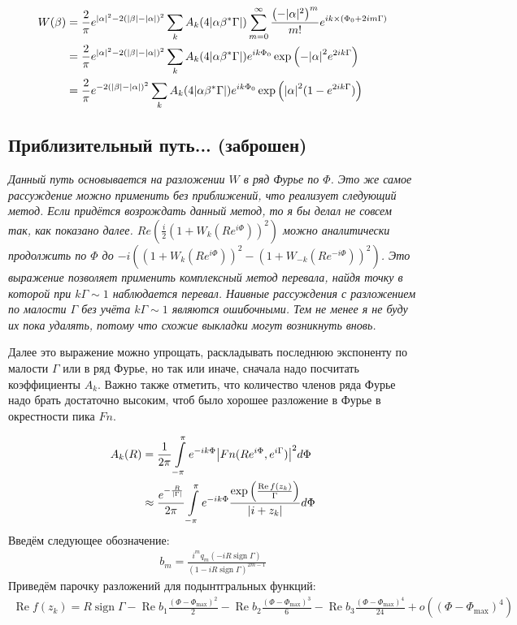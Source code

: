\documentclass[a4paper, 12pt]{article}
\DeclareMathOperator*{\sign}{sign}
\DeclareMathOperator*{\Real}{Re}
\newenvironment{eqw}{\begin{equation} \begin{aligned}}   
    {\end{aligned}    \end{equation}}
\begin{document}
\begin{eqw}
    W(\beta) &= \frac{2}{\pi}e^{\abs{\alpha}^2-2\left(\abs{\beta} - \abs{\alpha}\right)^2}
    \sum\limits_k A_k(4\abs{\alpha\beta^*\Gamma})
    \sum\limits_{m=0}^{\infty} \frac{\left(-|\alpha|^2\right)^m}{m!}e^{ik\times\left(\Phi_0+2im\Gamma\right)}\\
    &= \frac{2}{\pi}e^{\abs{\alpha}^2-2\left(\abs{\beta} - \abs{\alpha}\right)^2}
    \sum\limits_k A_k(4\abs{\alpha\beta^*\Gamma})e^{ik\Phi_0}
    \exp\left(-\abs{\alpha}^2 e^{2ik\Gamma}\right)\\
    &= \frac{2}{\pi}e^{-2\left(\abs{\beta} - \abs{\alpha}\right)^2}
    \sum\limits_k A_k(4\abs{\alpha\beta^*\Gamma})e^{ik\Phi_0}
    \exp\left(\abs{\alpha}^2 (1-e^{2ik\Gamma})\right)
\end{eqw}

\subsection*{Приблизительный путь... (заброшен)}
\textit{Данный путь основывается на разложении $W$ в ряд Фурье по $\Phi$. Это же самое рассуждение можно применить без приближений, что реализует следующий метод. Если придётся возрождать данный метод, то я бы делал не совсем так, как показано далее. $Re\left(\frac{i}{2}(1+W_k(Re^{i\Phi}))^2\right)$ можно аналитически продолжить по $\Phi$ до $-i\left(\left(1+W_k(Re^{i\Phi})\right)^2 - \left(1+W_{-k}(Re^{-i\Phi})\right)^2\right)$. Это выражение позволяет применить комплексный метод перевала, найдя точку в которой при $k\Gamma\sim 1$ наблюдается перевал. Наивные рассуждения с разложением по малости $\Gamma$ без учёта $k\Gamma\sim 1$ являются ошибочными. Тем не менее я не буду их пока удалять, потому что схожие выкладки могут возникнуть вновь.}

Далее это выражение можно упрощать, раскладывать последнюю экспоненту по малости $\Gamma$ или в ряд Фурье, но так или иначе, сначала надо посчитать коэффициенты $A_k$. Важно также отметить, что количество членов ряда Фурье надо брать достаточно высоким, чтоб было хорошее разложение в Фурье в окрестности пика $Fn$. 

\begin{eqw}
     A_k(R) &= \frac{1}{2\pi}\int\limits_{-\pi}^\pi e^{-ik\Phi} \abs{Fn(Re^{i\Phi}, e^{i\Gamma})}^2 d\Phi \\
    &\approx \frac{e^{-\frac{R}{\abs{\Gamma}}}}{2\pi}\int\limits_{-\pi}^\pi e^{-ik\Phi} 
    \frac{\exp\left(\frac{\Real f(z_k)}{\Gamma}\right)}{\abs{i+z_k}}d\Phi 
\end{eqw}
Введём следующее обозначение:
\begin{eqw}
    b_m = \frac{i^m q_m(-iR\sign\Gamma)}{\left(1-iR\sign \Gamma\right)^{2m-1}}
\end{eqw}
Приведём парочку разложений для подынтгральных функций:
\begin{eqw}
    \Real f(z_k) = R\sign\Gamma - \Real b_1 \frac{\left(\Phi - \Phi_{\max}\right)^2}{2} - \Real b_2 \frac{\left(\Phi - \Phi_{\max}\right)^3}{6} - \Real b_3 \frac{\left(\Phi - \Phi_{\max}\right)^4}{24}+o\left(\left(\Phi - \Phi_{\max}\right)^4\right)
\end{eqw}
\end{document}
